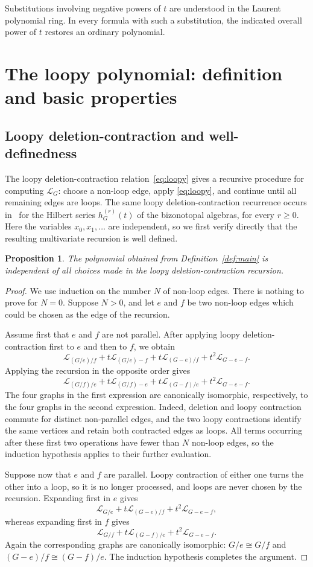 \documentclass[11pt]{article}
\theoremstyle{plain}
\newtheorem{proposition}[theorem]{Proposition}
\theoremstyle{definition}
\renewcommand{\mathcal}{\mathscr}
\newcommand{\LL}{\mathcal{L}}    %
\numberwithin{equation}{section}
\begin{document}
Substitutions involving negative powers of $t$ are understood in the Laurent polynomial ring.
In every formula with such a substitution, the indicated overall power of $t$ restores an ordinary polynomial.


\section{The loopy polynomial: definition and basic properties}\label{sec:properties}

\subsection{Loopy deletion-contraction and well-definedness}\label{subsec:well-definedness}

The loopy deletion-contraction relation~\eqref{eq:loopy} gives a recursive
procedure for computing $\LL_G$: choose a non-loop edge, apply
\eqref{eq:loopy}, and continue until all remaining edges are loops.  The same
loopy deletion-contraction recurrence occurs in~\cite[Theorem~3.5]{KNSV} for
the Hilbert series $h_G^{(r)}(t)$ of the bizonotopal algebras, for every
$r\ge 0$.  Here the variables $x_0,x_1,\ldots$ are independent, so we first
verify directly that the resulting multivariate recursion is well defined.

\begin{proposition}\label{prop:well-def}
The polynomial obtained from Definition~\ref{def:main} is independent of all
choices made in the loopy deletion-contraction recursion.
\end{proposition}

\begin{proof}
We use induction on the number $N$ of non-loop edges.  There is nothing to
prove for $N=0$.  Suppose $N>0$, and let $e$ and $f$ be two non-loop edges
which could be chosen as the edge of the recursion.

Assume first that $e$ and $f$ are not parallel.  After applying loopy
deletion-contraction first to $e$ and then to $f$, we obtain
\[
 \LL_{(G/e)/f}
 +t\LL_{(G/e)-f}
 +t\LL_{(G-e)/f}
 +t^2\LL_{G-e-f}.
\]
Applying the recursion in the opposite order gives
\[
 \LL_{(G/f)/e}
 +t\LL_{(G/f)-e}
 +t\LL_{(G-f)/e}
 +t^2\LL_{G-e-f}.
\]
The four graphs in the first expression are canonically isomorphic, respectively, to the four graphs in the second expression.  Indeed, deletion and loopy contraction commute for distinct non-parallel edges, and the two
loopy contractions identify the same vertices and retain both contracted edges as loops.
All terms occurring after these first two operations have fewer than $N$ non-loop edges, so the induction hypothesis applies to their further evaluation.

Suppose now that $e$ and $f$ are parallel.  Loopy contraction of either one turns the other into a loop, so it is no longer processed, and loops are never chosen by the recursion.  Expanding first in $e$ gives
\[
 \LL_{G/e}
 +t\LL_{(G-e)/f}
 +t^2\LL_{G-e-f},
\]
whereas expanding first in $f$ gives
\[
 \LL_{G/f}
 +t\LL_{(G-f)/e}
 +t^2\LL_{G-e-f}.
\]
Again the corresponding graphs are canonically isomorphic: $G/e\cong G/f$ and $(G-e)/f\cong(G-f)/e$.
The induction hypothesis completes the argument.
\end{proof}
\end{document}
